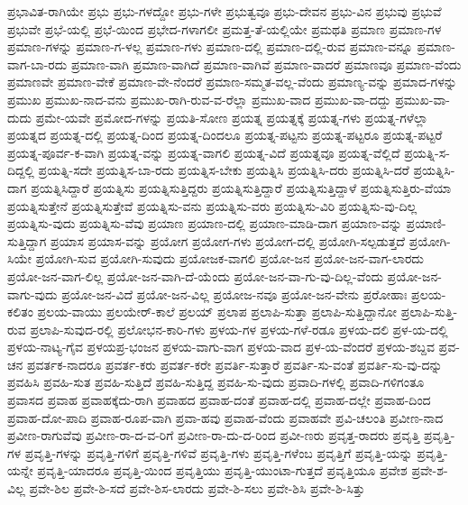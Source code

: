 {ಪ್ರಭಾವಿತ-ರಾಗಿಯೇ
ಪ್ರಭು
ಪ್ರಭು-ಗಳದ್ದೋ
ಪ್ರಭು-ಗಳೇ
ಪ್ರಭುತ್ವವೂ
ಪ್ರಭು-ದೇವನ
ಪ್ರಭು-ವಿನ
ಪ್ರಭುವು
ಪ್ರಭುವೆ
ಪ್ರಭುವೇ
ಪ್ರಭೆ-ಯಲ್ಲಿ
ಪ್ರಭೆ-ಯಿಂದ
ಪ್ರಭೇದ-ಗಳಾಗಲೀ
ಪ್ರಮತ್ತ-ತೆ-ಯಲ್ಲಿಯೇ
ಪ್ರಮಥತಿ
ಪ್ರಮಾಣ
ಪ್ರಮಾಣ-ಗಳ
ಪ್ರಮಾಣ-ಗಳನ್ನು
ಪ್ರಮಾಣ-ಗ-ಳಲ್ಲ
ಪ್ರಮಾಣ-ಗಳು
ಪ್ರಮಾಣ-ದಲ್ಲಿ
ಪ್ರಮಾಣ-ದಲ್ಲಿ-ರುವ
ಪ್ರಮಾಣ-ವನ್ನೂ
ಪ್ರಮಾಣ-ವಾಗ-ಬಾ-ರದು
ಪ್ರಮಾಣ-ವಾಗಿ
ಪ್ರಮಾಣ-ವಾಗಿದೆ
ಪ್ರಮಾಣ-ವಾಗಿವೆ
ಪ್ರಮಾಣ-ವಾದರೆ
ಪ್ರಮಾಣವೂ
ಪ್ರಮಾಣ-ವೆಂದು
ಪ್ರಮಾಣವೇ
ಪ್ರಮಾಣ-ವೇಕೆ
ಪ್ರಮಾಣ-ವೇ-ನೆಂದರೆ
ಪ್ರಮಾಣ-ಸಮ್ಮತ-ವಲ್ಲ-ವೆಂದು
ಪ್ರಮಾಣ್ಯ-ವನ್ನು
ಪ್ರಮಾದ-ಗಳನ್ನು
ಪ್ರಮುಖ
ಪ್ರಮುಖ-ನಾದ-ವನು
ಪ್ರಮುಖ-ರಾಗಿ-ರುವ-ವ-ರೆಲ್ಲಾ
ಪ್ರಮುಖ-ವಾದ
ಪ್ರಮುಖ-ವಾ-ದದ್ದು
ಪ್ರಮುಖ-ವಾ-ದುದು
ಪ್ರಮೇ-ಯವೇ
ಪ್ರಮೋದ-ಗಳನ್ನು
ಪ್ರಯತಿ-ಸೋಣ
ಪ್ರಯತ್ನ
ಪ್ರಯತ್ನಕ್ಕೆ
ಪ್ರಯತ್ನ-ಗಳು
ಪ್ರಯತ್ನ-ಗಳೆಲ್ಲಾ
ಪ್ರಯತ್ನದ
ಪ್ರಯತ್ನ-ದಲ್ಲಿ
ಪ್ರಯತ್ನ-ದಿಂದ
ಪ್ರಯತ್ನ-ದಿಂದಲೂ
ಪ್ರಯತ್ನ-ಪಟ್ಟನು
ಪ್ರಯತ್ನ-ಪಟ್ಟರೂ
ಪ್ರಯತ್ನ-ಪಟ್ಟರೆ
ಪ್ರಯತ್ನ-ಪೂರ್ವ-ಕ-ವಾಗಿ
ಪ್ರಯತ್ನ-ವನ್ನು
ಪ್ರಯತ್ನ-ವಾಗಲಿ
ಪ್ರಯತ್ನ-ವಿದೆ
ಪ್ರಯತ್ನವೂ
ಪ್ರಯತ್ನ-ವೆಲ್ಲಿದೆ
ಪ್ರಯತ್ನಿ-ಸ-ದಿದ್ದಲ್ಲಿ
ಪ್ರಯತ್ನಿ-ಸದೇ
ಪ್ರಯತ್ನಿಸ-ಬಾ-ರದು
ಪ್ರಯತ್ನಿಸ-ಬೇಕು
ಪ್ರಯತ್ನಿಸಿ
ಪ್ರಯತ್ನಿಸಿ-ದರು
ಪ್ರಯತ್ನಿಸಿ-ದರೆ
ಪ್ರಯತ್ನಿಸಿ-ದಾಗ
ಪ್ರಯತ್ನಿಸಿದ್ದಾರೆ
ಪ್ರಯತ್ನಿಸು
ಪ್ರಯತ್ನಿಸುತ್ತಿದ್ದರು
ಪ್ರಯತ್ನಿಸುತ್ತಿದ್ದಾರೆ
ಪ್ರಯತ್ನಿಸುತ್ತಿದ್ದಾಳೆ
ಪ್ರಯತ್ನಿಸುತ್ತಿರು-ವೆಯಾ
ಪ್ರಯತ್ನಿಸುತ್ತೇನೆ
ಪ್ರಯತ್ನಿಸುತ್ತೇವೆ
ಪ್ರಯತ್ನಿಸು-ವನು
ಪ್ರಯತ್ನಿಸು-ವರು
ಪ್ರಯತ್ನಿಸು-ವಿರಿ
ಪ್ರಯತ್ನಿಸು-ವು-ದಿಲ್ಲ
ಪ್ರಯತ್ನಿಸು-ವುದು
ಪ್ರಯತ್ನಿಸು-ವೆವು
ಪ್ರಯಾಣ
ಪ್ರಯಾಣ-ದಲ್ಲಿ
ಪ್ರಯಾಣ-ಮಾಡಿ-ದಾಗ
ಪ್ರಯಾಣ-ವನ್ನು
ಪ್ರಯಾಣಿ-ಸುತ್ತಿದ್ದಾಗ
ಪ್ರಯಾಸ
ಪ್ರಯಾಸ-ವನ್ನು
ಪ್ರಯೋಗ
ಪ್ರಯೋಗ-ಗಳು
ಪ್ರಯೋಗ-ದಲ್ಲಿ
ಪ್ರಯೋಗಿ-ಸಲ್ಪಡುತ್ತದೆ
ಪ್ರಯೋಗಿ-ಸಿಯೇ
ಪ್ರಯೋಗಿ-ಸುವ
ಪ್ರಯೋಗಿ-ಸುವುದು
ಪ್ರಯೋಜಕ-ವಾಗಲಿ
ಪ್ರಯೋ-ಜನ
ಪ್ರಯೋ-ಜನ-ವಾಗ-ಲಾರದು
ಪ್ರಯೋ-ಜನ-ವಾಗ-ಲಿಲ್ಲ
ಪ್ರಯೋ-ಜನ-ವಾಗಿ-ದೆ-ಯೆಂದು
ಪ್ರಯೋ-ಜನ-ವಾ-ಗು-ವು-ದಿಲ್ಲ-ವೆಂದು
ಪ್ರಯೋ-ಜನ-ವಾಗು-ವುದು
ಪ್ರಯೋ-ಜನ-ವಿದೆ
ಪ್ರಯೋ-ಜನ-ವಿಲ್ಲ
ಪ್ರಯೋಜ-ನವೂ
ಪ್ರಯೋ-ಜನ-ವೇನು
ಪ್ರರೋಹಾಃ
ಪ್ರಲಯ-ಕಲಿತಂ
ಪ್ರಲಯ-ವಾಯು
ಪ್ರಲಯೇರ್-ಕಾಲೆ
ಪ್ರಲಯ್
ಪ್ರಲಾಪ
ಪ್ರಲಾಪಿ-ಸುತ್ತಾ
ಪ್ರಲಾಪಿ-ಸುತ್ತಿದ್ದಾನೋ
ಪ್ರಲಾಪಿ-ಸುತ್ತಿ-ರುವ
ಪ್ರಲಾಪಿ-ಸುವುದ-ರಲ್ಲಿ
ಪ್ರಲೋಭನ-ಕಾರಿ-ಗಳು
ಪ್ರಳಯ-ಗಳ
ಪ್ರಳಯ-ಗಳೆ-ರಡೂ
ಪ್ರಳಯ-ದಲಿ
ಪ್ರಳ-ಯ-ದಲ್ಲಿ
ಪ್ರಳಯ-ನಾಟ್ಯ-ಗೈವ
ಪ್ರಳಯಪ್ರ-ಭಂಜನ
ಪ್ರಳಯ-ವಾಗು-ವಾಗ
ಪ್ರಳಯ-ವಾದ
ಪ್ರಳ-ಯ-ವೆಂದರೆ
ಪ್ರಳಯ-ಶಬ್ದವ
ಪ್ರವ-ಚನ
ಪ್ರವರ್ತಕ-ನಾದರೂ
ಪ್ರವರ್ತ-ಕರು
ಪ್ರವರ್ತ-ಕರೇ
ಪ್ರವರ್ತಿ-ಸುತ್ತಾರೆ
ಪ್ರವರ್ತಿ-ಸು-ವಂತೆ
ಪ್ರವರ್ತಿ-ಸು-ವು-ದನ್ನು
ಪ್ರವಹಿಸಿ
ಪ್ರವಹಿ-ಸುತ
ಪ್ರವಹಿ-ಸುತ್ತಿದೆ
ಪ್ರವಹಿ-ಸುತ್ತಿದ್ದ
ಪ್ರವಹಿ-ಸು-ವುದು
ಪ್ರವಾದಿ-ಗಳಲ್ಲಿ
ಪ್ರವಾದಿ-ಗಳಿಗಂತೂ
ಪ್ರವಾಸದ
ಪ್ರವಾಹ
ಪ್ರವಾಹಕ್ಕೆದು-ರಾಗಿ
ಪ್ರವಾಹದ
ಪ್ರವಾಹ-ದಂತೆ
ಪ್ರವಾಹ-ದಲ್ಲಿ
ಪ್ರವಾಹ-ದಲ್ಲೇ
ಪ್ರವಾಹ-ದಿಂದ
ಪ್ರವಾಹ-ದೋ-ಪಾದಿ
ಪ್ರವಾಹ-ರೂಪ-ವಾಗಿ
ಪ್ರವಾ-ಹವು
ಪ್ರವಾಹ-ವೆಂದು
ಪ್ರವಾಹವೇ
ಪ್ರವಿ-ಚಲಂತಿ
ಪ್ರವೀಣ-ನಾದ
ಪ್ರವೀಣ-ರಾಗುವೆವು
ಪ್ರವೀಣ-ರಾ-ದ-ವ-ರಿಗೆ
ಪ್ರವೀಣ-ರಾ-ದು-ದ-ರಿಂದ
ಪ್ರವೀ-ಣರು
ಪ್ರವೃತ್ತ-ರಾದರು
ಪ್ರವೃತ್ತಿ
ಪ್ರವೃತ್ತಿ-ಗಳ
ಪ್ರವೃತ್ತಿ-ಗಳನ್ನು
ಪ್ರವೃತ್ತಿ-ಗಳಿಗೆ
ಪ್ರವೃತ್ತಿ-ಗಳಿವೆ
ಪ್ರವೃತ್ತಿ-ಗಳು
ಪ್ರವೃತ್ತಿ-ಗಳೆಂಬ
ಪ್ರವೃತ್ತಿಗೆ
ಪ್ರವೃತ್ತಿ-ಯನ್ನು
ಪ್ರವೃತ್ತಿ-ಯನ್ನೇ
ಪ್ರವೃತ್ತಿ-ಯಾದರೂ
ಪ್ರವೃತ್ತಿ-ಯಿಂದ
ಪ್ರವೃತ್ತಿಯು
ಪ್ರವೃತ್ತಿ-ಯುಂಟಾ-ಗುತ್ತದೆ
ಪ್ರವೃತ್ತಿಯೂ
ಪ್ರವೇಶ
ಪ್ರವೇ-ಶ-ವಿಲ್ಲ
ಪ್ರವೇ-ಶಿಲ
ಪ್ರವೇ-ಶಿ-ಸದೆ
ಪ್ರವೇ-ಶಿಸ-ಲಾರದು
ಪ್ರವೇ-ಶಿ-ಸಲು
ಪ್ರವೇ-ಶಿಸಿ
ಪ್ರವೇ-ಶಿ-ಸಿತ್ತು
}
